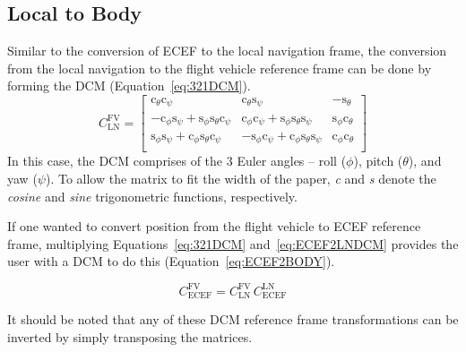\documentclass[12pt]{report}
\begin{document}
\subsection{Local to Body}
Similar to the conversion of ECEF to the local navigation frame, the conversion from the local navigation to the flight vehicle reference frame can be done by forming the DCM (Equation~\ref{eq:321DCM}).
\begin{equation}\label{eq:321DCM}
  C^{\textrm{FV}}_{\textrm{LN}} =
  \begin{bmatrix}
    \textrm{c}_{\theta}\textrm{c}_{\psi}                                                        & \textrm{c}_{\theta}\textrm{s}_{\psi}                                                        & -\textrm{s}_{\theta}                 \\
    -\textrm{c}_{\phi}\textrm{s}_{\psi} + \textrm{s}_{\phi}\textrm{s}_{\theta}\textrm{c}_{\psi} & \textrm{c}_{\phi}\textrm{c}_{\psi} + \textrm{s}_{\phi}\textrm{s}_{\theta}\textrm{s}_{\psi}  & \textrm{s}_{\phi}\textrm{c}_{\theta} \\
    \textrm{s}_{\phi}\textrm{s}_{\psi} + \textrm{c}_{\phi}\textrm{s}_{\theta}\textrm{c}_{\psi}  & -\textrm{s}_{\phi}\textrm{c}_{\psi} + \textrm{c}_{\phi}\textrm{s}_{\theta}\textrm{s}_{\psi} & \textrm{c}_{\phi}\textrm{c}_{\theta} \\
  \end{bmatrix}
\end{equation}
In this case, the DCM comprises of the 3 Euler angles {--} roll (\( \phi \)), pitch (\( \theta \)), and yaw (\( \psi \)). To allow the matrix to fit the width of the paper, \textit{c} and \textit{s} denote the \textit{cosine} and \textit{sine} trigonometric functions, respectively.

If one wanted to convert position from the flight vehicle to ECEF reference frame, multiplying Equations~\ref{eq:321DCM} and~\ref{eq:ECEF2LNDCM} provides the user with a DCM to do this (Equation~\ref{eq:ECEF2BODY}).

\begin{equation}\label{eq:ECEF2BODY}
  C^{\textrm{FV}}_{\textrm{ECEF}} = C^{\textrm{FV}}_{\textrm{LN}} \, C^{\textrm{LN}}_{\textrm{ECEF}}
\end{equation}

It should be noted that any of these DCM reference frame transformations can be inverted by simply transposing the matrices.

\clearpage
\end{document}
